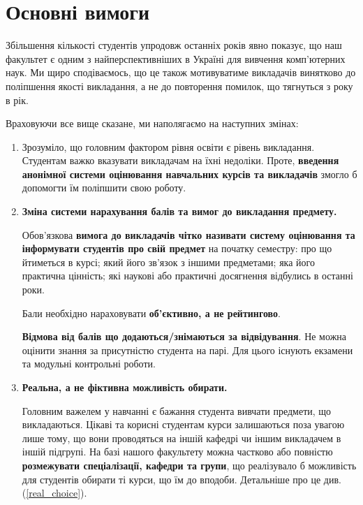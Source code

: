 \documentclass[14pt, a4paper]{extarticle}  %
\begin{document}
\newpage

\section{Основні вимоги}
Збільшення кількості студентів упродовж останніх років явно показує, що наш факультет є одним з найперспективніших в Україні для вивчення комп'ютерних наук. Ми щиро сподіваємось, що це також мотивуватиме викладачів винятково до поліпшення якості викладання, а не до повторення помилок, що тягнуться з року в рік. 

Враховуючи все вище сказане, ми наполягаємо на наступних змінах:
\begin{enumerate}
    \item  
    Зрозуміло, що головним фактором рівня освіти є рівень викладання. Студентам важко вказувати викладачам на їхні недоліки. Проте, \textbf{ введення анонімної системи оцінювання навчальних курсів та викладачів} змогло б допомогти їм поліпшити свою роботу. 
    
    \item  \textbf{Зміна системи нарахування балів та вимог до викладання предмету.}
    
    Обов'язкова \textbf{вимога до викладачів чітко називати систему оцінювання та інформувати студентів про свій предмет} на початку семестру: про що йтиметься в курсі; який його зв'язок з іншими предметами; яка його практична цінність; які наукові або практичні досягнення відбулись в останні роки.
    
    Бали необхідно нараховувати \textbf{об'єктивно, а не рейтингово}. 
    
    \textbf{Відмова від балів що додаються/знімаються за відвідування}. Не можна оцінити знання за присутністю студента на парі. Для цього існують екзамени та модульні контрольні роботи.
    
    \item \textbf{Реальна, а не фіктивна можливість обирати.} 
    
    Головним важелем у навчанні є бажання студента вивчати предмети, що викладаються. Цікаві та корисні студентам курси залишаються поза увагою лише тому, що вони проводяться на іншій кафедрі чи іншим викладачем в іншій підгрупі. На базі нашого факультету можна частково або повністю \textbf{розмежувати спеціалізації, кафедри та групи}, що реалізувало б можливість для студентів обирати ті курси, що їм до вподоби. Детальніше про це див. (\ref{real_choice}). 
\end{enumerate}
\end{document}
